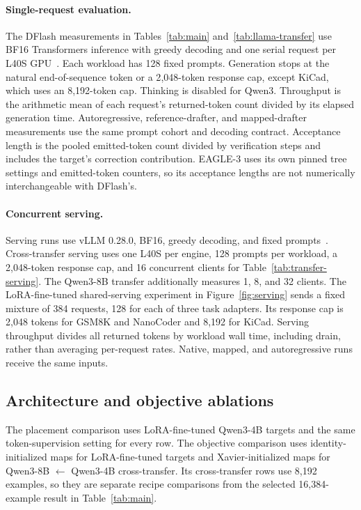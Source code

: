 \paragraph{Single-request evaluation.}
The DFlash measurements in Tables~\ref{tab:main} and~\ref{tab:llama-transfer} use BF16 Transformers inference with greedy decoding and one serial request per L40S GPU~\citep{wolf2020transformers}. Each workload has 128 fixed prompts. Generation stops at the natural end-of-sequence token or a 2{,}048-token response cap, except KiCad, which uses an 8{,}192-token cap. Thinking is disabled for Qwen3. Throughput is the arithmetic mean of each request's returned-token count divided by its elapsed generation time. Autoregressive, reference-drafter, and mapped-drafter measurements use the same prompt cohort and decoding contract. Acceptance length is the pooled emitted-token count divided by verification steps and includes the target's correction contribution. EAGLE-3 uses its own pinned tree settings and emitted-token counters, so its acceptance lengths are not numerically interchangeable with DFlash's.

\paragraph{Concurrent serving.}
Serving runs use vLLM 0.28.0, BF16, greedy decoding, and fixed prompts~\citep{kwon2023vllm}. Cross-transfer serving uses one L40S per engine, 128 prompts per workload, a 2{,}048-token response cap, and 16 concurrent clients for Table~\ref{tab:transfer-serving}. The Qwen3-8B transfer additionally measures 1, 8, and 32 clients. The LoRA-fine-tuned shared-serving experiment in Figure~\ref{fig:serving} sends a fixed mixture of 384 requests, 128 for each of three task adapters. Its response cap is 2{,}048 tokens for GSM8K and NanoCoder and 8{,}192 for KiCad. Serving throughput divides all returned tokens by workload wall time, including drain, rather than averaging per-request rates. Native, mapped, and autoregressive runs receive the same inputs.

\subsection{Architecture and objective ablations}
\label{app:architecture-objective}

The placement comparison uses LoRA-fine-tuned Qwen3-4B targets and the same token-supervision setting for every row. The objective comparison uses identity-initialized maps for LoRA-fine-tuned targets and Xavier-initialized maps for Qwen3-8B $\leftarrow$ Qwen3-4B cross-transfer. Its cross-transfer rows use 8{,}192 examples, so they are separate recipe comparisons from the selected 16{,}384-example result in Table~\ref{tab:main}.

